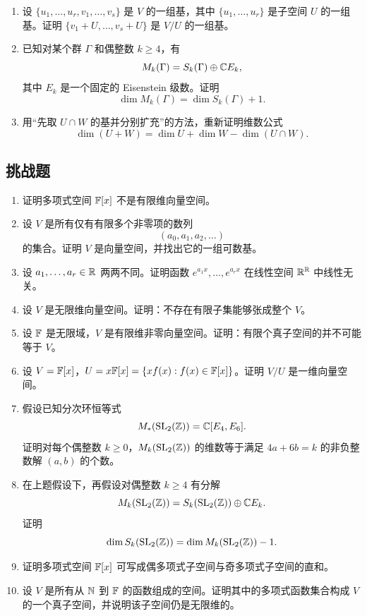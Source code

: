 \begin{enumerate}[label=\arabic*., start=31, leftmargin=2.5em]
  \item \medium 设 $\{u_1,\dots,u_r,v_1,\dots,v_s\}$ 是 $V$ 的一组基，其中 $\{u_1,\dots,u_r\}$ 是子空间 $U$ 的一组基。证明 $\{v_1+U,\dots,v_s+U\}$ 是 $V/U$ 的一组基。
  \item \medium 已知对某个群 $\Gamma$ 和偶整数 $k\ge 4$，有
  \[
  M_k(\Gamma)=S_k(\Gamma)\oplus \mathbb{C} E_k,
  \]
  其中 $E_k$ 是一个固定的 Eisenstein 级数。证明
  \[
  \dim M_k(\Gamma)=\dim S_k(\Gamma)+1.
  \]
  \item \medium 用“先取 $U\cap W$ 的基并分别扩充”的方法，重新证明维数公式
  \[
  \dim(U+W)=\dim U+\dim W-\dim(U\cap W).
  \]
\end{enumerate}

\subsection*{挑战题}
\begin{enumerate}[label=\arabic*., start=51, leftmargin=2.5em]
  \item \hard 证明多项式空间 $\mathbb{F}[x]$ 不是有限维向量空间。
  \item \hard 设 $V$ 是所有仅有有限多个非零项的数列
  \[
  (a_0,a_1,a_2,\dots)
  \]
  的集合。证明 $V$ 是向量空间，并找出它的一组可数基。
  \item \hard 设 $a_1,\dots,a_r\in\mathbb{R}$ 两两不同。证明函数 $e^{a_1x},\dots,e^{a_rx}$ 在线性空间 $\mathbb{R}^{\mathbb{R}}$ 中线性无关。
  \item \hard 设 $V$ 是无限维向量空间。证明：不存在有限子集能够张成整个 $V$。
  \item \hard 设 $\mathbb{F}$ 是无限域，$V$ 是有限维非零向量空间。证明：有限个真子空间的并不可能等于 $V$。
  \item \hard 设 $V=\mathbb{F}[x]$，$U=x\mathbb{F}[x]=\{xf(x):f(x)\in\mathbb{F}[x]\}$。证明 $V/U$ 是一维向量空间。
  \item \hard 假设已知分次环恒等式
  \[
  M_*(\mathrm{SL}_2(\mathbb{Z}))=\mathbb{C}[E_4,E_6].
  \]
  证明对每个偶整数 $k\ge 0$，$M_k(\mathrm{SL}_2(\mathbb{Z}))$ 的维数等于满足 $4a+6b=k$ 的非负整数解 $(a,b)$ 的个数。
  \item \hard 在上题假设下，再假设对偶整数 $k\ge 4$ 有分解
  \[
  M_k(\mathrm{SL}_2(\mathbb{Z}))=S_k(\mathrm{SL}_2(\mathbb{Z}))\oplus \mathbb{C} E_k.
  \]
  证明
  \[
  \dim S_k(\mathrm{SL}_2(\mathbb{Z}))=\dim M_k(\mathrm{SL}_2(\mathbb{Z}))-1.
  \]
  \item \hard 证明多项式空间 $\mathbb{F}[x]$ 可写成偶多项式子空间与奇多项式子空间的直和。
  \item \hard 设 $V$ 是所有从 $\mathbb{N}$ 到 $\mathbb{F}$ 的函数组成的空间。证明其中的多项式函数集合构成 $V$ 的一个真子空间，并说明该子空间仍是无限维的。
\end{enumerate}

